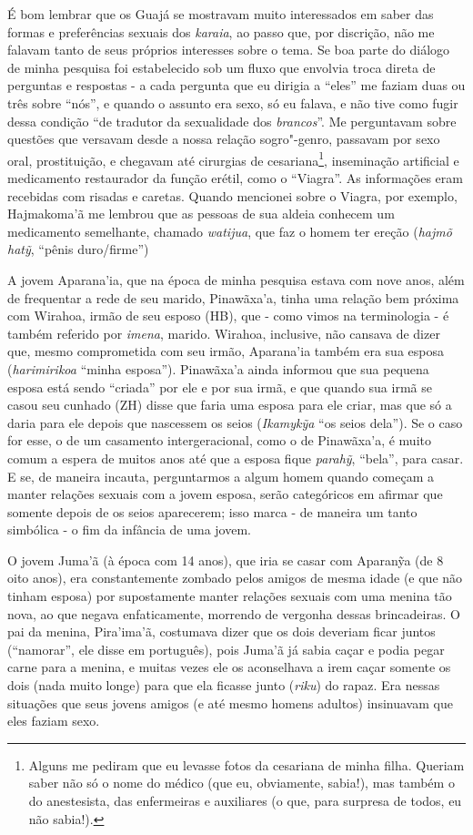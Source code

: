 É bom lembrar que os Guajá se mostravam muito interessados em saber das
formas e preferências sexuais dos \emph{karaia}, ao passo que, por
discrição, não me falavam tanto de seus próprios interesses sobre o
tema. Se boa parte do diálogo de minha pesquisa foi estabelecido sob um
fluxo que envolvia troca direta de perguntas e respostas - a cada
pergunta que eu dirigia a ``eles'' me faziam duas ou três sobre ``nós'', e
quando o assunto era sexo, só eu falava, e não tive como fugir dessa
condição ``de tradutor da sexualidade dos \emph{brancos}''. Me perguntavam
sobre questões que versavam desde a nossa relação sogro"-genro, passavam
por sexo oral, prostituição, e chegavam até cirurgias de
cesariana\footnote{Alguns me pediram que eu levasse fotos da cesariana
  de minha filha. Queriam saber não só o nome do médico (que eu,
  obviamente, sabia!), mas também o do anestesista, das enfermeiras e
  auxiliares (o que, para surpresa de todos, eu não sabia!).},
inseminação artificial e medicamento restaurador da função erétil, como
o ``Viagra''. As informações eram recebidas com risadas e caretas.
Quando mencionei sobre o Viagra, por exemplo, Hajmakoma'ã me lembrou que
as pessoas de sua aldeia conhecem um medicamento semelhante, chamado
\emph{watijua}, que faz o homem ter ereção (\emph{hajmõ hatỹ}, ``pênis
duro/firme'')

A jovem Aparana'ia, que na época de minha pesquisa estava com nove anos,
além de frequentar a rede de seu marido, Pinawãxa'a, tinha uma relação
bem próxima com Wirahoa, irmão de seu esposo (HB), que - como vimos na
terminologia - é também referido por \emph{imena}, marido. Wirahoa,
inclusive, não cansava de dizer que, mesmo comprometida com seu irmão,
Aparana'ia também era sua esposa (\emph{harimirikoa} ``minha esposa'').
Pinawãxa'a ainda informou que sua pequena esposa está sendo ``criada'' por
ele e por sua irmã, e que quando sua irmã se casou seu cunhado (ZH)
disse que faria uma esposa para ele criar, mas que só a daria para ele
depois que nascessem os seios (\emph{Ikamykỹa} ``os seios dela''). Se o
caso for esse, o de um casamento intergeracional, como o de Pinawãxa'a,
é muito comum a espera de muitos anos até que a esposa fique
\emph{parahỹ}, ``bela'', para casar. E se, de maneira incauta,
perguntarmos a algum homem quando começam a manter relações sexuais com
a jovem esposa, serão categóricos em afirmar que somente depois de os
seios aparecerem; isso marca - de maneira um tanto simbólica - o fim da
infância de uma jovem.

O jovem Juma'ã (à época com 14 anos), que iria se casar com Aparanỹa (de
8 oito anos), era constantemente zombado pelos amigos de mesma idade (e
que não tinham esposa) por supostamente manter relações sexuais com uma
menina tão nova, ao que negava enfaticamente, morrendo de vergonha
dessas brincadeiras. O pai da menina, Pira'ima'ã, costumava dizer que os
dois deveriam ficar juntos (``namorar'', ele disse em português), pois
Juma'ã já sabia caçar e podia pegar carne para a menina, e muitas vezes
ele os aconselhava a irem caçar somente os dois (nada muito longe) para
que ela ficasse junto (\emph{riku}) do rapaz. Era nessas situações que
seus jovens amigos (e até mesmo homens adultos) insinuavam que eles
faziam sexo.

